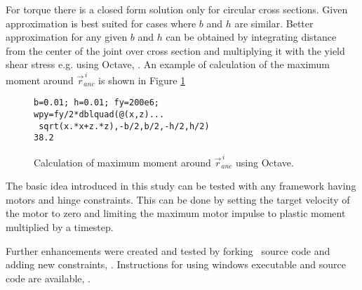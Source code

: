 For torque there is a closed form solution only for
circular cross sections.
Given approximation is 
best suited for cases where $b$ and $h$ are similar.
Better approximation for any given $b$ and $h$ can be obtained 
by integrating distance from the center of the joint over cross section and
multiplying it with the yield shear stress e.g. using Octave, \cite{octave}.
An example of calculation of the maximum moment  around $\vec{r}_{anc}^{\,i} $
is shown in Figure \ref{fig:octave-mp}

\begin{figure}
\centering
\lstset{language=octave}
\begin{lstlisting}
b=0.01; h=0.01; fy=200e6;
wpy=fy/2*dblquad(@(x,z)...
 sqrt(x.*x+z.*z),-b/2,b/2,-h/2,h/2)
38.2
\end{lstlisting}

\caption{Calculation of maximum moment  around $\vec{r}_{anc}^{\,i} $ using Octave.}
\label{fig:octave-mp}
\end{figure}


The basic idea introduced in this study can be tested with any framework having motors and hinge constraints.
This can be done by setting the target velocity of the motor to zero and limiting 
the maximum motor impulse to plastic moment multiplied by a timestep.

Further enhancements were created and tested by forking \bullet\ source code
and adding new constraints, \cite{pbullet}.
Instructions for using  windows executable and  source code are available, \cite{bp}.

